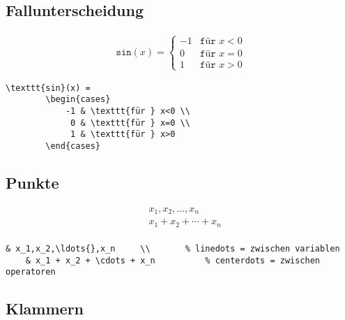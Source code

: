 \subsection{Fallunterscheidung}\label{fallunterscheidung }

\begin{align}
\texttt{sin}(x) =
	\begin{cases}
		-1 & \texttt{für } x<0 \\
		 0 & \texttt{für } x=0 \\
		 1 & \texttt{für } x>0
	\end{cases}
\end{align}

\lstset{language=[LaTeX]TeX } %
\begin{lstlisting}[gobble=2, frame=none, numbers=none, backgroundcolor=\color{white},%
	caption={},label={code:}]
	\texttt{sin}(x) =
		\begin{cases}
			-1 & \texttt{für } x<0 \\
			 0 & \texttt{für } x=0 \\
			 1 & \texttt{für } x>0
		\end{cases}
\end{lstlisting}


\subsection{Punkte}\label{punkte }

\begin{align}
& x_1,x_2,\ldots{},x_n     \\		%
& x_1 + x_2 + \cdots + x_n \\		%
\end{align}

\lstset{language=[LaTeX]TeX } %
\begin{lstlisting}[gobble=2, frame=none, numbers=none, backgroundcolor=\color{white},%
	caption={},label={code:}]
	& x_1,x_2,\ldots{},x_n     \\		% linedots = zwischen variablen
	& x_1 + x_2 + \cdots + x_n  		% centerdots = zwischen operatoren
\end{lstlisting}


\subsection{Klammern}\label{klammern }

